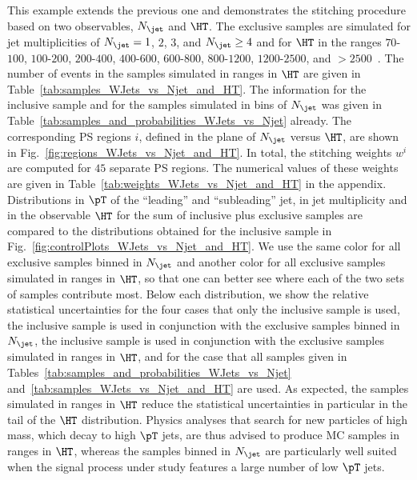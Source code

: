 This example extends the previous one and demonstrates the stitching procedure based on two observables, $N_{\jet}$ and $\HT$.
The exclusive samples are simulated for jet multiplicities of $N_{\jet} = 1$, $2$, $3$, and $N_{\jet} \geq 4$ 
and for $\HT$ in the ranges $70$-$100$, $100$-$200$, $200$-$400$, $400$-$600$, $600$-$800$, $800$-$1200$, $1200$-$2500$, and $> 2500$~\GeV.
The number of events in the samples simulated in ranges in $\HT$ are given in Table~\ref{tab:samples_WJets_vs_Njet_and_HT}.
The information for the inclusive sample and for the samples simulated in bins of $N_{\jet}$ was given in Table~\ref{tab:samples_and_probabilities_WJets_vs_Njet} already.
The corresponding PS regions $i$, defined in the plane of $N_{\jet}$ versus $\HT$, are shown in Fig.~\ref{fig:regions_WJets_vs_Njet_and_HT}.
In total, the stitching weights $w^{i}$ are computed for $45$ separate PS regions.
The numerical values of these weights are given in Table~\ref{tab:weights_WJets_vs_Njet_and_HT} in the appendix.
Distributions in $\pT$ of the ``leading'' and ``subleading'' jet,
in jet multiplicity and in the observable $\HT$ 
for the sum of inclusive plus exclusive samples are compared to the distributions obtained for the inclusive sample in Fig.~\ref{fig:controlPlots_WJets_vs_Njet_and_HT}.
We use the same color for all exclusive samples binned in $N_{\jet}$ and another color for all exclusive samples simulated in ranges in $\HT$,
so that one can better see where each of the two sets of samples contribute most.
Below each distribution, we show the relative statistical uncertainties for the four cases that
only the inclusive sample is used, the inclusive sample is used in conjunction with the exclusive samples binned in $N_{\jet}$,
the inclusive sample is used in conjunction with the exclusive samples simulated in ranges in $\HT$,
and for the case that all samples given in Tables~\ref{tab:samples_and_probabilities_WJets_vs_Njet} and~\ref{tab:samples_WJets_vs_Njet_and_HT} are used.
As expected, the samples simulated in ranges in $\HT$ reduce the statistical uncertainties in particular in the tail of the $\HT$ distribution.
Physics analyses that search for new particles of high mass, which decay to high $\pT$ jets, are thus advised to produce MC samples in ranges in $\HT$,
whereas the samples binned in $N_{\jet}$ are particularly well suited when the signal process under study features a large number of low $\pT$ jets.

